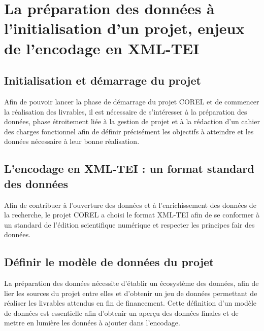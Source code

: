 \documentclass[a4paper,12pt,twoside]{book}
\newcommand{\fair}{\gls{fair}\xspace}
\newcommand{\COREL}{\gls{COREL}\xspace}
\newcommand{\XML}{\gls{XML}\xspace}
\newcommand{\TEI}{\gls{TEI}\xspace}
\newcommand{\clearemptydoublepage}{\newpage{\pagestyle{empty}\cleardoublepage}}
\begin{document}
        \clearemptydoublepage


    \part{La préparation des données à l’initialisation d’un projet, enjeux de l’encodage en XML-TEI}
        \chapter{Initialisation et démarrage du projet}
        Afin de pouvoir lancer la phase de démarrage du projet \COREL et de commencer la réalisation des livrables, il est nécessaire de s'intéresser à la préparation des données, phase étroitement liée à la gestion de projet et à la rédaction d'un cahier des charges fonctionnel afin de définir précisément les objectifs à atteindre et les données nécessaire à leur bonne réalisation.
                    
            
        \clearemptydoublepage
        
        \chapter{L’encodage en XML-TEI : un format standard des données}
        Afin de contribuer à l'ouverture des données et à l'enrichissement des données de la recherche, le projet \COREL a choisi le format \XML-\TEI afin de se conformer à un standard de l'édition scientifique numérique et respecter les principes \fair des données.
                    
             
            
        \clearemptydoublepage
        
        \chapter{Définir le modèle de données du projet}
        La préparation des données nécessite d'établir un écosystème des données, afin de lier les sources du projet entre elles et d'obtenir un jeu de données permettant de réaliser les livrables attendus en fin de financement. Cette définition d'un modèle de données est essentielle afin d'obtenir un aperçu des données finales et de mettre en lumière les données à ajouter dans l'encodage.
                    
             
            
        \clearemptydoublepage
\end{document}
